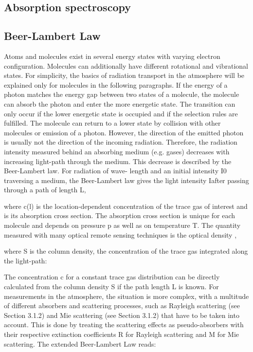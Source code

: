 \documentclass  [
  paper    = a4,
  BCOR     = 10mm,
  twoside,
  fontsize = 12pt,
  fleqn,
  toc      = bibnumbered,
  toc      = listofnumbered,
  numbers  = noendperiod,
  headings = normal,
  listof   = leveldown,
  version  = 3.03
]                                       {scrreprt}
\begin{document}
	\subsection{Absorption spectroscopy}
	\subsection*{Beer-Lambert Law}
	Atoms and molecules exist in several energy states with varying electron configuration.
	Molecules can additionally have different rotational and vibrational
	states. For simplicity, the basics of radiation transport in the atmosphere will
	be explained only for molecules in the following paragraphs.
	If the energy of a photon matches the energy gap between two states of a
	molecule, the molecule can absorb the photon and enter the more energetic
	state. The transition can only occur if the lower energetic state is occupied and
	if the selection rules are fulfilled. The molecule can return to a lower state by
	collision with other molecules or emission of a photon. However, the direction
	of the emitted photon is usually not the direction of the incoming radiation.
	Therefore, the radiation intensity measured behind an absorbing medium (e.g.
	gases) decreases with increasing light-path through the medium.
	This decrease is described by the Beer-Lambert law. For radiation of wave-
	length  and an initial intensity I0 traversing a medium, the Beer-Lambert
	law gives the light intensity Iafter passing through a path of length L,

	where c(l) is the location-dependent concentration of the trace gas of interest
	and  is its absorption cross section. The absorption cross section is
	unique for each molecule and depends on pressure p as well as on temperature T.
	The quantity measured with many optical remote sensing techniques is the
	optical density ,

	where S is the column density, the concentration of the trace gas integrated
	along the light-path:

	The concentration c for a constant trace gas distribution can be directly calculated
	from the column density S if the path length L is known.
	For measurements in the atmosphere, the situation is more complex, with
	a multitude of different absorbers and scattering processes, such as Rayleigh
	scattering (see Section 3.1.2) and Mie scattering (see Section 3.1.2) that have
	to be taken into account. This is done by treating the scattering effects as
	pseudo-absorbers with their respective extinction coefficients R for Rayleigh
	scattering and M for Mie scattering. The extended Beer-Lambert Law reads:
\end{document}
